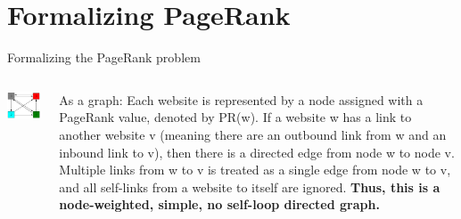 \documentclass{beamer}
\begin{document}
\section{Formalizing PageRank}
\begin{frame}[t]{Formalizing the PageRank problem}
\begin{outline}
    \begin{columns}
        \begin{column}{0.5\textwidth}
            \includegraphics[width=\textwidth]{unweighted.png}
        \end{column}
        \begin{column}{0.5\textwidth}
            As a graph: Each website is represented by a node assigned with a PageRank value, denoted by PR(w). If a website w has a link to another website v (meaning there are an outbound link from w and an inbound link to v), then there is a directed edge from node w to node v. Multiple links from w to v is treated as a single edge from node w to v, and all self-links from a website to itself are ignored. \textbf{Thus, this is a node-weighted, simple, no self-loop directed graph.}
        \end{column}
    \end{columns}
\end{outline}
\end{frame}
\end{document}
